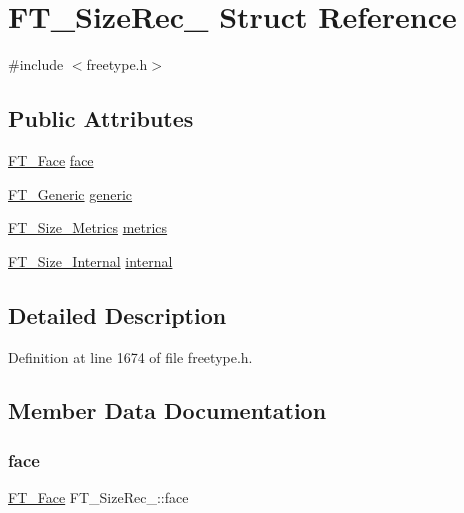 \hypertarget{struct_f_t___size_rec__}{}\section{F\+T\+\_\+\+Size\+Rec\+\_\+ Struct Reference}
\label{struct_f_t___size_rec__}


{\ttfamily \#include $<$freetype.\+h$>$}

\subsection*{Public Attributes}
\begin{DoxyCompactItemize}
\item 
\mbox{\hyperlink{freetype_8h_a7eba045ee20968354fa1bff0f69740fa}{F\+T\+\_\+\+Face}} \mbox{\hyperlink{struct_f_t___size_rec___a21b54fb07feaba8be23321054da98f5f}{face}}
\item 
\mbox{\hyperlink{fttypes_8h_ae15e8550dd7d863328686aadaead5c77}{F\+T\+\_\+\+Generic}} \mbox{\hyperlink{struct_f_t___size_rec___aa24520b093a9b4ba9ff388bfe7b9491d}{generic}}
\item 
\mbox{\hyperlink{freetype_8h_a8b7a8201f8d155cac76cfb03302c2672}{F\+T\+\_\+\+Size\+\_\+\+Metrics}} \mbox{\hyperlink{struct_f_t___size_rec___a29a6b518d09f6cf1714d9aed01eddc01}{metrics}}
\item 
\mbox{\hyperlink{freetype_8h_a59c5fa003a18285aab769cb96252499c}{F\+T\+\_\+\+Size\+\_\+\+Internal}} \mbox{\hyperlink{struct_f_t___size_rec___a236c47ea3138e485c29b0d7baa5cf3b6}{internal}}
\end{DoxyCompactItemize}


\subsection{Detailed Description}


Definition at line 1674 of file freetype.\+h.



\subsection{Member Data Documentation}
\mbox{\label{struct_f_t___size_rec___a21b54fb07feaba8be23321054da98f5f}} 
\subsubsection{\texorpdfstring{face}{face}}
{\footnotesize\ttfamily \mbox{\hyperlink{freetype_8h_a7eba045ee20968354fa1bff0f69740fa}{F\+T\+\_\+\+Face}} F\+T\+\_\+\+Size\+Rec\+\_\+\+::face}



